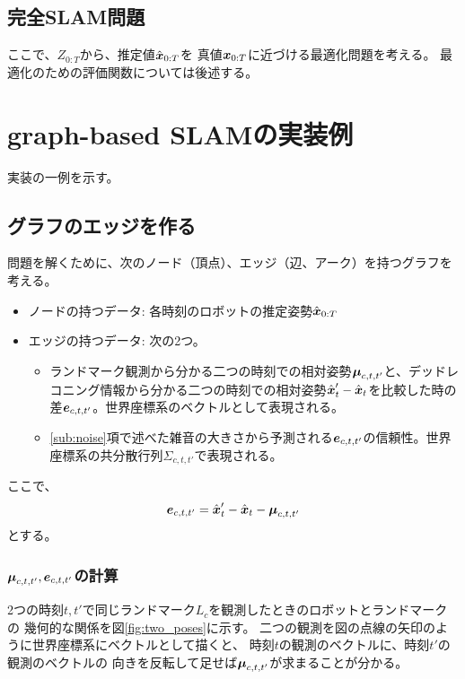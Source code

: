 \subsection{完全SLAM問題}

ここで、$Z_{0:T}$から、推定値$\hat{\boldsymbol{x}}_{0:T}$を
真値$\boldsymbol{x}_{0:T}$に近づける最適化問題を考える。
最適化のための評価関数については後述する。

\section{graph-based SLAMの実装例}

実装の一例を示す。

\subsection{グラフのエッジを作る}

問題を解くために、次のノード（頂点）、エッジ（辺、アーク）を持つグラフを考える。
\begin{itemize}
	\item ノードの持つデータ: 各時刻のロボットの推定姿勢$\hat{\boldsymbol{x}}_{0:T}$
	\item エッジの持つデータ: 次の2つ。
	\begin{itemize}
		\item ランドマーク観測から分かる二つの時刻での相対姿勢$\boldsymbol{\mu}_{c,t,t'}$と、デッドレコニング情報から分かる二つの時刻での相対姿勢$\hat{\boldsymbol{x}}_t' - \hat{\boldsymbol{x}}_t$を比較した時の差$\boldsymbol{e}_{c,t,t'}$。世界座標系のベクトルとして表現される。
		\item \ref{sub:noise}項で述べた雑音の大きさから予測される$\boldsymbol{e}_{c,t,t'}$の信頼性。世界座標系の共分散行列$\Sigma_{c,t,t'}$で表現される。
	\end{itemize}
\end{itemize}
ここで、
\begin{align}
	\boldsymbol{e}_{c,t,t'} = \hat{\boldsymbol{x}}_t' - \hat{\boldsymbol{x}}_t - \boldsymbol{\mu}_{c,t,t'}\label{eq:e}
\end{align}
とする。

\subsubsection{$\boldsymbol{\mu}_{c,t,t'}, \boldsymbol{e}_{c,t,t'}$の計算}

2つの時刻$t,t'$で同じランドマーク$L_c$を観測したときのロボットとランドマークの
幾何的な関係を図\ref{fig:two_poses}に示す。
二つの観測を図の点線の矢印のように世界座標系にベクトルとして描くと、
時刻$t$の観測のベクトルに、時刻$t'$の観測のベクトルの
向きを反転して足せば$\boldsymbol{\mu}_{c,t,t'}$が求まることが分かる。


